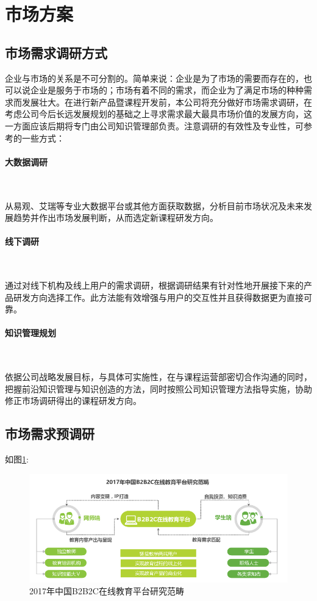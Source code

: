 \section{市场方案}
\subsection{市场需求调研方式}

企业与市场的关系是不可分割的。简单来说：企业是为了市场的需要而存在的，也可以说企业是服务于市场的；市场有着不同的需求，而企业为了满足市场的种种需求而发展壮大。在进行新产品暨课程开发前，本公司将充分做好市场需求调研，在考虑公司今后长远发展规划的基础之上寻求需求最大最具市场价值的发展方向，这一方面应该后期将专门由公司知识管理部负责。注意调研的有效性及专业性，可参考的一些方式：

\paragraph{大数据调研}\

从易观、艾瑞等专业大数据平台或其他方面获取数据，分析目前市场状况及未来发展趋势并作出市场发展判断，从而选定新课程研发方向。

\paragraph{线下调研}\

通过对线下机构及线上用户的需求调研，根据调研结果有针对性地开展接下来的产品研发方向选择工作。此方法能有效增强与用户的交互性并且获得数据更为直接可靠。

\paragraph{知识管理规划}\

依据公司战略发展目标，与具体可实施性，在与课程运营部密切合作沟通的同时，把握前沿知识管理与知识创造的方法，同时按照公司知识管理方法指导实施，协助修正市场调研得出的课程研发方向。

\subsection{市场需求预调研}
如图\ref{fg:B2B2C2017}:
\begin{figure}[H]
	\centering
	\includegraphics[width=0.9\columnwidth]{figures/B2B2C2017.png}
	\caption{2017年中国B2B2C在线教育平台研究范畴}
	\label{fg:B2B2C2017}
\end{figure}

